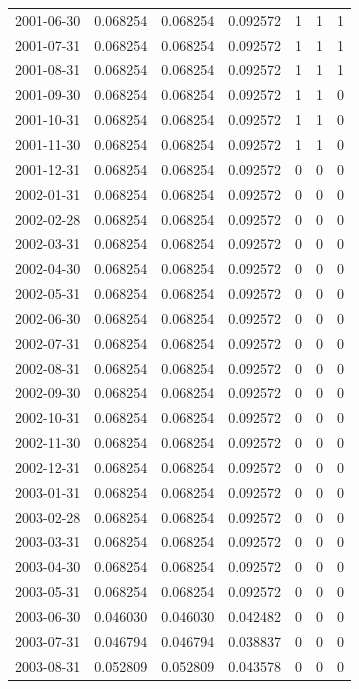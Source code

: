 \documentclass[conference,onecolumn]{IEEEtran}
\begin{document}
\begin{longtable}{|c|c|c|c|c|c|c|}
2001-06-30 & 0.068254 & 0.068254 & 0.092572 & 1 & 1 & 1 \\
2001-07-31 & 0.068254 & 0.068254 & 0.092572 & 1 & 1 & 1 \\
2001-08-31 & 0.068254 & 0.068254 & 0.092572 & 1 & 1 & 1 \\
2001-09-30 & 0.068254 & 0.068254 & 0.092572 & 1 & 1 & 0 \\
2001-10-31 & 0.068254 & 0.068254 & 0.092572 & 1 & 1 & 0 \\
2001-11-30 & 0.068254 & 0.068254 & 0.092572 & 1 & 1 & 0 \\
2001-12-31 & 0.068254 & 0.068254 & 0.092572 & 0 & 0 & 0 \\
2002-01-31 & 0.068254 & 0.068254 & 0.092572 & 0 & 0 & 0 \\
2002-02-28 & 0.068254 & 0.068254 & 0.092572 & 0 & 0 & 0 \\
2002-03-31 & 0.068254 & 0.068254 & 0.092572 & 0 & 0 & 0 \\
2002-04-30 & 0.068254 & 0.068254 & 0.092572 & 0 & 0 & 0 \\
2002-05-31 & 0.068254 & 0.068254 & 0.092572 & 0 & 0 & 0 \\
2002-06-30 & 0.068254 & 0.068254 & 0.092572 & 0 & 0 & 0 \\
2002-07-31 & 0.068254 & 0.068254 & 0.092572 & 0 & 0 & 0 \\
2002-08-31 & 0.068254 & 0.068254 & 0.092572 & 0 & 0 & 0 \\
2002-09-30 & 0.068254 & 0.068254 & 0.092572 & 0 & 0 & 0 \\
2002-10-31 & 0.068254 & 0.068254 & 0.092572 & 0 & 0 & 0 \\
2002-11-30 & 0.068254 & 0.068254 & 0.092572 & 0 & 0 & 0 \\
2002-12-31 & 0.068254 & 0.068254 & 0.092572 & 0 & 0 & 0 \\
2003-01-31 & 0.068254 & 0.068254 & 0.092572 & 0 & 0 & 0 \\
2003-02-28 & 0.068254 & 0.068254 & 0.092572 & 0 & 0 & 0 \\
2003-03-31 & 0.068254 & 0.068254 & 0.092572 & 0 & 0 & 0 \\
2003-04-30 & 0.068254 & 0.068254 & 0.092572 & 0 & 0 & 0 \\
2003-05-31 & 0.068254 & 0.068254 & 0.092572 & 0 & 0 & 0 \\
2003-06-30 & 0.046030 & 0.046030 & 0.042482 & 0 & 0 & 0 \\
2003-07-31 & 0.046794 & 0.046794 & 0.038837 & 0 & 0 & 0 \\
2003-08-31 & 0.052809 & 0.052809 & 0.043578 & 0 & 0 & 0 \\

\end{longtable}
\end{document}
